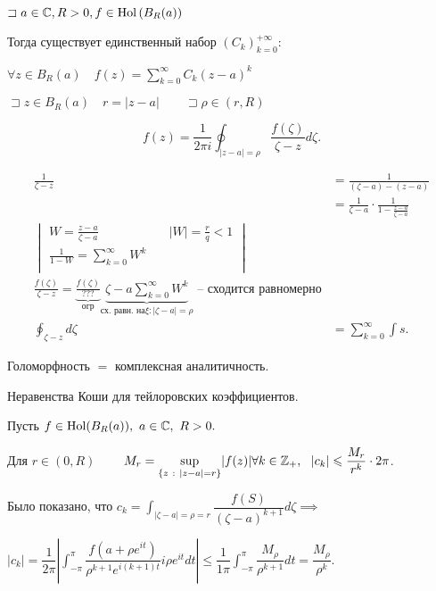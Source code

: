 \begin{theorem}

    $\sqsupset a\in \mathbb{C}, R > 0, f\in \mathrm{Hol}\left( B_R(a) \right) $

    Тогда существует единственный набор $\left( C_k \right) _{k=0}^{+\infty }$:

    $\forall z\in B_R(a)\quad f(z) = \sum_{k=0}^{\infty }C_k(z-a)^k$

    $\sqsupset z\in B_R(a)\quad r = |z-a|\qquad \sqsupset \rho\in \left( r, R \right) $

    \[
    f(z) = \frac{1}{2\pi i} \oint_{|z-a| = \rho} \frac{f(\zeta)}{\zeta - z}d\zeta
    .\]

    \begin{align*}
        \frac{1}{\zeta - z} &= \frac{1}{\left( \zeta - a \right)  - \left( z - a \right) } \\
        &= \frac{1}{\zeta - a} \cdot \frac{1}{1 - \frac{z - a}{\zeta - a}} \\
        \begin{vmatrix}
            W = \frac{z-a}{\zeta - a}&\quad |W| = \frac{r}{q} < 1\\
            \frac{1}{1  - W} = \sum_{k=0}^{\infty }W^k &\\
        \end{vmatrix}\\
        \frac{f(\zeta)}{\zeta - z} = \underbrace{\frac{f(\zeta)}{???}}_{\text{огр}} \underbrace{{\zeta - a}\sum_{k=0}^{\infty }W^k}_{\text{сх. равн. на}\xi: |\zeta - a| = \rho} \text{ -- сходится равномерно}\\
        \oint_{\zeta - z}d\zeta &= \sum_{k=0}^{\infty } \int s
    .\end{align*}

    \begin{corollary}
        Голоморфность $=$ комплексная аналитичность.
    \end{corollary}

    \begin{corollary}
        Неравенства Коши для тейлоровских коэффициентов.

        Пусть $f\in \mathrm{Hol} (B_R(a)),~ a\in \mathbb{C}, ~R>0.$

        Для $r\in (0, R)$ ~~~ $M_r = \underset{\{ z ~:~ |z - a| = r\} }{\sup} | f (z ) | \forall k \in \Z_+, ~~ |c_k| \leqslant \dfrac{M_r}{r^k} \cdot 2\pi$.

        Было показано, что $c_k = \int_{|\zeta - a| =\rho = r} \dfrac{f(S)}{(\zeta - a)^{k + 1}} d\zeta \implies$

        $|c_k| = \dfrac{1}{2\pi}\left| \int_{-\pi}^\pi \dfrac{f (a + \rho e ^{it})}{\rho^{k + 1} e^{i(k + 1) t}} i \rho e ^{it} dt \right| \leqslant \dfrac{1}{1\pi} \int_{-\pi}^\pi \dfrac{M_\rho}{\rho^{k + 1}} dt = \dfrac{M_\rho}{\rho^{k}}$.
    \end{corollary}


\end{theorem}


